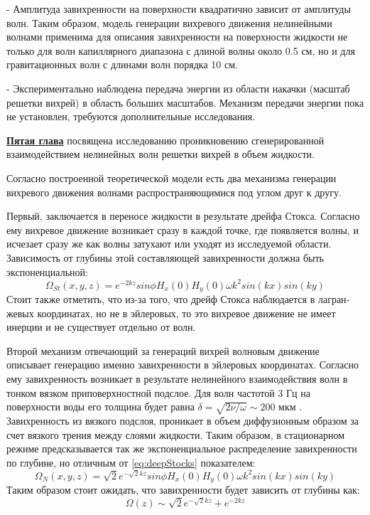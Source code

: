  - Амплитуда завихренности на поверхности квадратично зависит от амплитуды волн. Таким образом, модель генерации вихревого движения нелинейными волнами применима для описания завихренности на поверх­ности жидкости не только для волн капиллярного диапазона с длиной волны около 0.5 см, но и для гравитационных волн с длинами волн порядка 10 см.
 
 - Экспериментально наблюдена передача энергии из области накачки (масштаб решетки вихрей) в область больших масштабов. Механизм передачи энергии пока не установлен, требуются дополнительные исследования.
 
 \underline{\textbf{Пятая глава}} посвящена исследованию проникновению сгенерированной взаимодействием нелинейных волн решетки вихрей в объем жидкости.
 
Согласно построенной теоретической модели есть два механизма генерации вихревого движения волнами распространяющимися под углом друг к другу.

Первый, заключается в переносе жидкости в результате дрейфа Стокса. Согласно ему вихревое движение возникает сразу в каждой точке, где появляет­ся волны, и исчезает сразу же как волны затухают или уходят из исследуемой области. Зависимость от глубины этой составляющей завихренности должна быть экспоненциальной:
\begin{equation}
 \label{eq:deepStocks}
\Omega_{St}(x,y,z) = e^{-2kz} sin \phi H_x(0) H_y(0) \omega k^2 sin(kx)sin(ky)
\end{equation}
Стоит также отметить, что из-за того, что дрейф Стокса наблюдается в лагран­жевых координатах, но не в эйлеровых, то это вихревое движение не имеет инерции и не существует отдельно от волн.  

Второй механизм отвечающий за генераций вихрей волновым движение описывает генерацию именно завихренности в эйлеровых координатах. Согласно ему завихренность возникает в результате нелинейного взаимодействия волн в тонком вязком приповерхностной подслое. Для волн частотой 3 Гц на поверхности воды его толщина будет равна $\delta = \sqrt{2 \nu / \omega} \sim 200 $ мкм \cite{FalkovichBook}. Завихренность из вязкого подслоя, проникает в объем диффузионным образом за счет вязкого трения между слоями жидкости. Таким образом, в стационарном режиме предсказывается так же экспоненциальное распределение завихренности по глубине, но отличным от \ref{eq:deepStocks} показателем:
\begin{equation}
 \label{eq:deepEyler}
\Omega_N(x,y,z) = \sqrt{2}e^{-\sqrt{2}kz} sin \phi H_x(0) H_y(0) \omega k^2 sin(kx)sin(ky)
\end{equation}
Таким образом стоит ожидать, что завихренности будет зависить от глубины как:
\begin{equation}
 \label{eq:deepFull}
\Omega(z) \sim \sqrt{2}e^{-\sqrt{2}kz} +  e^{-2kz}
\end{equation}

